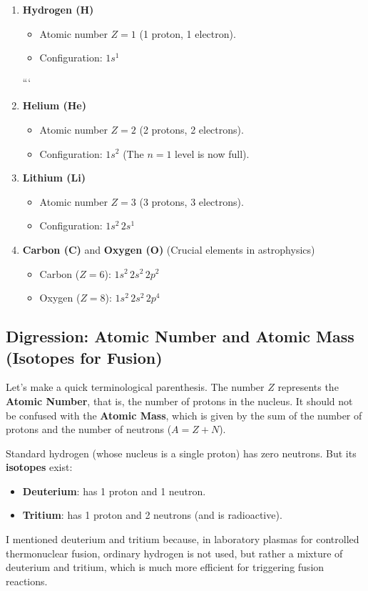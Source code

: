 \begin{enumerate}
\item \textbf{Hydrogen (H)}
\begin{itemize}
\item Atomic number $Z = 1$ (1 proton, 1 electron).
\item Configuration: \textbf{$1s^1$}
\end{itemize}


```

\item \textbf{Helium (He)}
\begin{itemize}
\item Atomic number $Z = 2$ (2 protons, 2 electrons).
\item Configuration: \textbf{$1s^2$} (The $n=1$ level is now full).
\end{itemize}

\item \textbf{Lithium (Li)}
\begin{itemize}
\item Atomic number $Z = 3$ (3 protons, 3 electrons).
\item Configuration: \textbf{$1s^2 \, 2s^1$}
\end{itemize}

\item \textbf{Carbon (C)} and \textbf{Oxygen (O)} (Crucial elements in astrophysics)
\begin{itemize}
\item Carbon ($Z = 6$): \textbf{$1s^2 \, 2s^2 \, 2p^2$}
\item Oxygen ($Z = 8$): \textbf{$1s^2 \, 2s^2 \, 2p^4$}
\end{itemize}

\end{enumerate}

\subsection{Digression: Atomic Number and Atomic Mass (Isotopes for Fusion)}

Let's make a quick terminological parenthesis. The number $Z$ represents the \textbf{Atomic Number}, that is, the number of protons in the nucleus.
It should not be confused with the \textbf{Atomic Mass}, which is given by the sum of the number of protons and the number of neutrons ($A = Z + N$).

Standard hydrogen (whose nucleus is a single proton) has zero neutrons. But its \textbf{isotopes} exist:
\begin{itemize}
\item \textbf{Deuterium}: has 1 proton and 1 neutron.
\item \textbf{Tritium}: has 1 proton and 2 neutrons (and is radioactive).
\end{itemize}
I mentioned deuterium and tritium because, in laboratory plasmas for controlled thermonuclear fusion, ordinary hydrogen is not used, but rather a mixture of deuterium and tritium, which is much more efficient for triggering fusion reactions.

